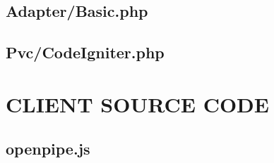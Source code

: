 \documentclass[12pt]{report}
\newcommand{\rootPath}{../../}
\newcommand{\rootServerPath}{\rootPath server/}
\newcommand{\rootServerPhpPath}{\rootServerPath php/}
\newcommand{\rootClientPath}{\rootPath client/}
\newcommand{\rootClientJsPath}{\rootClientPath js/}
\newcommand{\phplist}[1]{}
\newcommand{\jslist}[1]{}
\begin{document}
\section{Adapter/Basic.php} 
\phplist{OpenPipe/Adapter/Basic.php}

\section{Pvc/CodeIgniter.php} 
\phplist{OpenPipe/Adapter/Pvc/CodeIgniter.php}

\chapter{CLIENT SOURCE CODE}

\section{openpipe.js} 
\jslist{openpipe.js}
\end{document}
